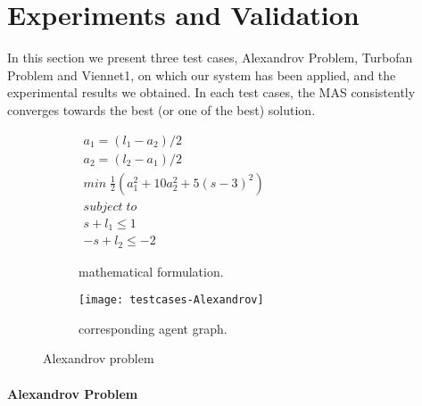 \part{Experiments and Validation}

In this section we present three test cases, Alexandrov Problem, Turbofan Problem and Viennet1, on which our system has been applied, and the experimental results we obtained. In each test cases, the MAS consistently converges towards the best (or one of the best) solution.

\begin{figure}
\centering
	\begin{subfigure}[b]{0.4\textwidth}
		$\begin{array}{c}
			a_1 = (l_1 - a_2)/2 \\
			a_2 = (l_2 - a_1)/2 \\
			min \; \frac{1}{2}(a_1^2 + 10a_2^2 + 5(s-3)^2) \\
			subject \; to \\
			s + l_1 \leq 1 \\
			-s + l_2 \leq -2
		\end{array}$
		\caption{mathematical formulation.}\label{alexandrov:math}
	\end{subfigure}
	\hfill%
	\begin{subfigure}[b]{0.5\textwidth}
		\texttt{[image: testcases-Alexandrov]}%
		\caption{corresponding agent graph.}\label{alexandrov:graph}
	\end{subfigure}
\caption{Alexandrov problem}\label{alexandrov}
\end{figure}

\subsection{Alexandrov Problem}

